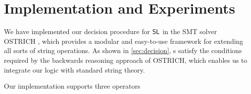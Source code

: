 \section{Implementation and Experiments}
\label{sect:impl}

We have implemented our decision procedure for $\mathsf{SL}$ in the SMT solver OSTRICH \cite{CHL+19}, which provides a modular and easy-to-use framework for extending all sorts of string operations. As shown in \ref{sec:decision}, \PSST s satisfy the conditions required by the backwards reasoning approach of OSTRICH, which enables us to integrate our logic with standard string theory.

Our implementation supports three operators
